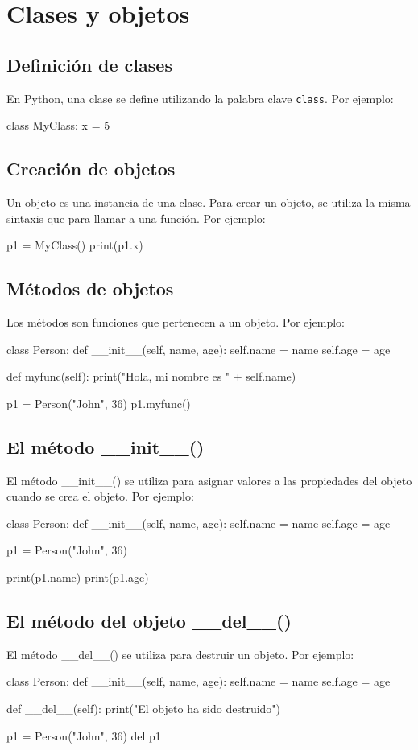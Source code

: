 \documentclass{article}
\begin{document}
\section{Clases y objetos}
\subsection{Definición de clases}
En Python, una clase se define utilizando la palabra clave \texttt{class}. Por ejemplo:
\begin{python_code}
class MyClass:
  x = 5
\end{python_code}
\subsection{Creación de objetos}
Un objeto es una instancia de una clase. Para crear un objeto, se utiliza la misma sintaxis que para llamar a una función. Por ejemplo:
\begin{python_code}
p1 = MyClass()
print(p1.x)
\end{python_code}
\subsection{Métodos de objetos}
Los métodos son funciones que pertenecen a un objeto. Por ejemplo:
\begin{python_code}
class Person:
  def __init__(self, name, age):
    self.name = name
    self.age = age

  def myfunc(self):
    print("Hola, mi nombre es " + self.name)

p1 = Person("John", 36)
p1.myfunc()
\end{python_code}
\subsection{El método \_\_init\_\_()}
El método \_\_init\_\_() se utiliza para asignar valores a las propiedades del objeto cuando se crea el objeto. Por ejemplo:
\begin{python_code}
class Person:
  def __init__(self, name, age):
    self.name = name
    self.age = age

p1 = Person("John", 36)

print(p1.name)
print(p1.age)
\end{python_code}
\subsection{El método del objeto \_\_del\_\_()}
El método \_\_del\_\_() se utiliza para destruir un objeto. Por ejemplo:
\begin{python_code}
class Person:
  def __init__(self, name, age):
    self.name = name
    self.age = age

  def __del__(self):
    print("El objeto ha sido destruido")

p1 = Person("John", 36)
del p1
\end{python_code}
\end{document}
